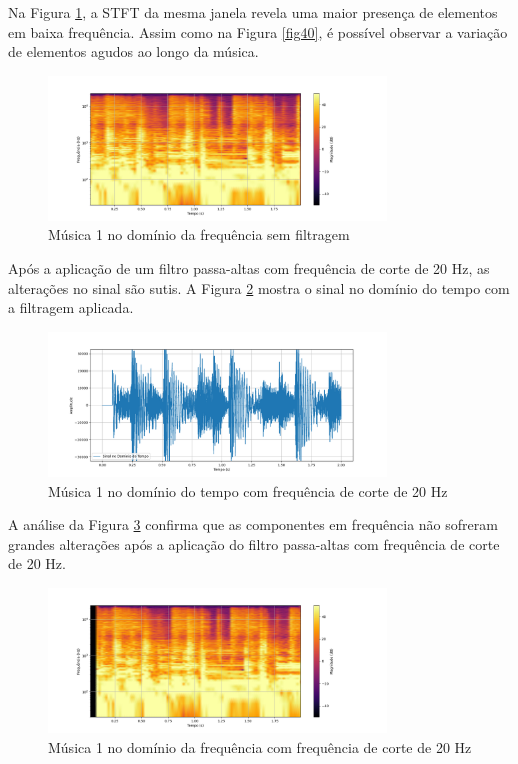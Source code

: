 Na Figura \ref{fig41}, a STFT da mesma janela revela uma maior presença de elementos em baixa frequência. Assim como na Figura \ref{fig40}, é possível observar a variação de elementos agudos ao longo da música.

\begin{figure}[h]
    \centering
    \includegraphics[width=0.8\textwidth]{figuras/fig41.png}
    \caption{Música 1 no domínio da frequência sem filtragem}
    \label{fig41}
\end{figure}

Após a aplicação de um filtro passa-altas com frequência de corte de 20 Hz, as alterações no sinal são sutis. A Figura \ref{fig24} mostra o sinal no domínio do tempo com a filtragem aplicada.

\begin{figure}[h]
    \centering
    \includegraphics[width=0.8\textwidth]{figuras/fig24.png}
    \caption{Música 1 no domínio do tempo com frequência de corte de 20 Hz}
    \label{fig24}
\end{figure}

A análise da Figura \ref{fig25} confirma que as componentes em frequência não sofreram grandes alterações após a aplicação do filtro passa-altas com frequência de corte de 20 Hz.

\begin{figure}[h]
    \centering
    \includegraphics[width=0.8\textwidth]{figuras/fig25.png}
    \caption{Música 1 no domínio da frequência com frequência de corte de 20 Hz}
    \label{fig25}
\end{figure}


